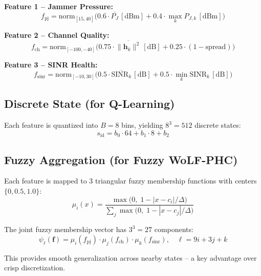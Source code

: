 \documentclass[11pt,a4paper]{article}
\begin{document}
\textbf{Feature 1 -- Jammer Pressure:}
\begin{equation}
f_{\mathrm{pj}} = \mathrm{norm}_{[15,40]}\!\Big(0.6 \cdot \overline{P_J}\,[\text{dBm}] + 0.4 \cdot \max_k P_{J,k}\,[\text{dBm}]\Big)
\end{equation}

\textbf{Feature 2 -- Channel Quality:}
\begin{equation}
f_{\mathrm{ch}} = \mathrm{norm}_{[-100,-40]}\!\Big(0.75 \cdot \overline{\|\mathbf{h}_k\|^2}\,[\text{dB}] + 0.25 \cdot (1 - \text{spread})\Big)
\end{equation}

\textbf{Feature 3 -- SINR Health:}
\begin{equation}
f_{\mathrm{sinr}} = \mathrm{norm}_{[-10,30]}\!\Big(0.5 \cdot \overline{\mathrm{SINR}_k}\,[\text{dB}] + 0.5 \cdot \min_k \mathrm{SINR}_k\,[\text{dB}]\Big)
\end{equation}

\subsection{Discrete State (for Q-Learning)}

Each feature is quantized into $B = 8$ bins, yielding $8^3 = 512$ discrete states:
\begin{equation}
s_{\mathrm{id}} = b_0 \cdot 64 + b_1 \cdot 8 + b_2
\end{equation}

\subsection{Fuzzy Aggregation (for Fuzzy WoLF-PHC)}

Each feature is mapped to 3 triangular fuzzy membership functions with centers $\{0, 0.5, 1.0\}$:
\begin{equation}
\mu_i(x) = \frac{\max\!\big(0,\; 1 - |x - c_i|/\Delta\big)}{\sum_j \max\!\big(0,\; 1 - |x - c_j|/\Delta\big)}
\end{equation}

The joint fuzzy membership vector has $3^3 = 27$ components:
\begin{equation}
\psi_{\ell}(\mathbf{f}) = \mu_{i}(f_{\mathrm{pj}}) \cdot \mu_{j}(f_{\mathrm{ch}}) \cdot \mu_{k}(f_{\mathrm{sinr}}), \quad \ell = 9i + 3j + k
\end{equation}

This provides smooth generalization across nearby states -- a key advantage over crisp discretization.
\end{document}
